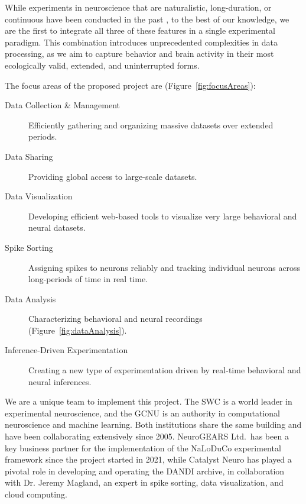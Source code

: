 While experiments in neuroscience that are naturalistic, long-duration, or
continuous have been conducted in the past
\citep[e.g.,][]{jhuangEtAl10,maoEtAl21,volohEtAl23}, to the best of our
knowledge, we are the first to integrate all three of these features in a
single experimental paradigm.
%
This combination introduces unprecedented complexities in data processing, as
we aim to capture behavior and brain activity in their most ecologically valid,
extended, and uninterrupted forms.

The focus areas of the proposed project are (Figure~\ref{fig:focusAreas}):

\begin{description}

    \item[Data Collection \& Management] Efficiently gathering and organizing
        massive datasets over extended periods.

    \item[Data Sharing] Providing global access to large-scale datasets.

    \item[Data Visualization] Developing efficient web-based tools to visualize
        very large behavioral and neural datasets.

    \item[Spike Sorting] Assigning spikes to neurons reliably and tracking
        individual neurons across long-periods of time in real time.

    \item[Data Analysis] Characterizing behavioral and neural recordings
        (Figure~\ref{fig:dataAnalysis}).

    \item[Inference-Driven Experimentation] Creating a new type of
        experimentation driven by real-time behavioral and neural inferences.

\end{description}

We are a unique team to implement this project.
%
The SWC is a world leader in experimental neuroscience, and the GCNU is an
authority in computational neuroscience and machine learning. Both institutions
share the same building and have been collaborating extensively since 2005.
%
NeuroGEARS Ltd.\ has been a key business partner for the implementation of the
NaLoDuCo experimental framework since the project started in 2021,
%
while Catalyst Neuro has played a pivotal role in developing and operating the
DANDI archive,
%
in collaboration with Dr. Jeremy Magland, an expert in spike sorting, data
visualization, and cloud computing.

